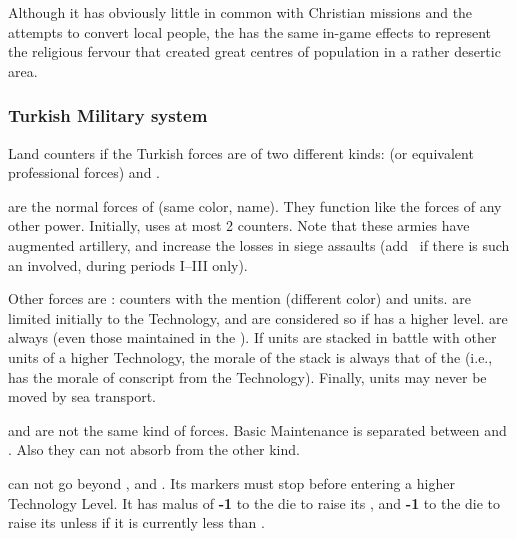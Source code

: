\begin{designnote}
  Although it has obviously little in common with Christian missions
  and the attempts to convert local people, the \constructionKaaba has
  the same in-game effects to represent the religious fervour that
  created great centres of population in a rather desertic area.
\end{designnote}


\subsubsection{Turkish Military system}

Land counters if the Turkish forces are of two different kinds:
\Janissaire (or equivalent professional forces) and \Timar.

\bparag[Janissaries] \Janissaire are the normal forces of \TUR (same
color, name). They function like the forces of any other power.
Initially, \TUR uses at most 2 \Janissaire \ARMY counters.  Note that
these armies have augmented artillery, and increase the losses in siege
assaults (add \td\ if there is such an \ARMY\faceplus involved, during
periods I--III only).

\bparag[Timars] Other forces are \Timar: counters with the \Timar
mention (different color) and \Pashas units.  \Timar are limited
initially to the \TARQ Technology, and are considered so if \TUR has a
higher level.  \Timar are always  (even those
maintained in the ).  If \Timar units are stacked in
battle with other units of a higher Technology, the morale of the stack
is always that of the \Timar (i.e., has the morale of conscript from the
\Timar Technology).  Finally, \Timar units may never be moved by sea
transport.

\bparag \Janissaire and \Timar are not the same kind of forces.  Basic
Maintenance is separated between \Janissaire and \Timar.  Also they can not
absorb \LD from the other kind.

\label{chSpecific:Turkey:Army Tech}
\TUR can not go beyond  \TMUS, and  \TBAT. Its markers must stop before entering a higher Technology
Level.  It has malus of {\bf -1} to the die to raise its , and {\bf -1} to the die to raise its 
unless if it is currently less than \TARQ.

